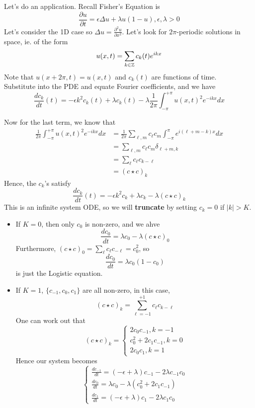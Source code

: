 \documentclass{article}
\begin{document}
Let's do an application. Recall Fisher's Equation is
\[\frac{\partial u}{\partial t} = \epsilon \Delta u + \lambda u(1 - u), \epsilon, \lambda > 0\]
Let's consider the 1D case so $\Delta u = \frac{\partial^2 u}{\partial x^2}$. Let's look for $2\pi$-periodic solutions in space, ie. of the form
\[u(x, t) = \sum_{k \in \mathbb{Z}} c_k(t) e^{i k x}\]
Note that $u(x + 2\pi ,t) = u(x, t)$ and $c_k(t)$ are functions of time.\\

Substitute into the PDE and equate Fourier coefficients, and we have
\[\frac{dc_k}{dt}(t) = - \epsilon k^2 c_k(t) + \lambda c_k(t) - \lambda  \frac{1}{2\pi} \int_{-\pi}^{+\pi} u(x, t)^2 e^{-i k x} dx \]

Now for the last term, we know that
\begin{align*}
    \frac{1}{2\pi} \int_{-\pi}^{+\pi} u(x, t)^2 e^{-i k x} dx &= \frac{1}{2\pi} \sum_{\ell, m} c_\ell c_m \int_{-\pi}^{\pi} e^{i(\ell +m -k)x} dx\\
    &= \sum_{\ell, m} c_\ell c_m \delta_{\ell + m, k} \tag*{Dirac Delta Function}\\
    &= \sum_\ell c_\ell c_{k-\ell}\\
    &= (c \star c)_k \tag*{Convolution}
\end{align*}
Hence, the $c_k$'s satisfy
\[\frac{dc_k}{dt}(t) = - \epsilon k^2 c_k + \lambda c_k - \lambda (c \star c)_k\]
This is an infinite system ODE, so we will \textbf{truncate} by setting $c_k = 0$ if $|k| > K$.
\begin{itemize}
    \item If $K = 0$, then only $c_0$ is non-zero, and we ahve
    \[\frac{d c_0}{dt} =  \lambda c_0 - \lambda (c \star c)_0\]
    Furthermore, $(c \star c)_0 = \sum_{\ell} c_\ell c_{-\ell} = c_0^2$, so
    \[\frac{dc_0}{dt} = \lambda c_0 (1 - c_0)\]
    is just the Logistic equation.

    \item If $K = 1$, $\{c_{-1}, c_0, c_1\}$ are all non-zero, in this case,
    \[(c \star c)_k = \sum_{\ell = -1}^{+1} c_\ell c_{k - \ell} \]
    One can work out that 
    \[(c \star c)_k  = \begin{cases}
        2 c_0 c_{-1}, k = -1\\
        c_0^2 + 2 c_1 c_{-1}, k = 0\\
        2 c_0 c_1, k = 1
    \end{cases}\]
    Hence our system becomes
    \[\begin{cases}
        \frac{dc_{-1}}{dt} = (-\epsilon +\lambda) c_{-1} - 2 \lambda c_{-1} c_0\\
        \frac{dc_0}{dt} = \lambda c_0 - \lambda (c_0^2 + 2 c_1 c_{-1})\\
        \frac{dc_1}{dt} = (-\epsilon + \lambda) c_1 - 2 \lambda c_1 c_0
    \end{cases}\]
\end{itemize}
\end{document}
